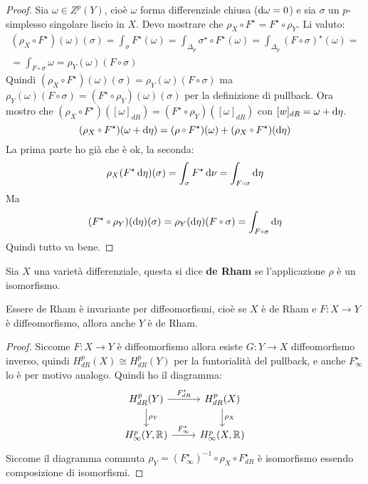 \begin{proof}
  Sia $ \omega \in Z^p(Y) $, cioè $ \omega $ forma differenziale chiusa ($ \operatorname{d}\!{\omega} = 0 $)
  e sia $ \sigma $ un $ p $-simplesso singolare liscio in $ X $. Devo
  mostrare che $ \rho_X \circ F^\star = F^\star \circ \rho_Y $. Li valuto:
  \begin{gather*}
    (\rho_X \circ F^\star)(\omega)(\sigma) = \int_\sigma F^\star(\omega) = \int_{\Delta_p} \sigma^\star \circ F^\star (\omega) = \int_{\Delta_p} (F \circ \sigma)^\star(\omega) = \\
    = \int_{F \circ \sigma} \omega = \rho_Y(\omega)(F \circ \sigma)
  \end{gather*}
  Quindi $ (\rho_X \circ F^\star)(\omega)(\sigma) = \rho_Y(\omega)(F \circ \sigma) $ ma $ \rho_Y(\omega)(F \circ \sigma) = (F^\star \circ \rho_Y)(\omega)(\sigma) $
  per la definizione di pullback.
  Ora mostro che $ (\rho_X \circ F^\star)([\omega]_{dR}) = (F^\star \circ \rho_Y)([\omega]_{dR}) $ con $ [w]_{dR} = \omega + \operatorname{d}\!{\eta} $.
  \[
    (\rho_X \circ F^\star)(\omega + \d \eta) = (\rho \circ F^\star)(\omega) + (\rho_X \circ F^\star)(\d \eta)
  \]
  La prima parte ho già che è ok, la seconda:
  \[
    \rho_X(F^\star \d \eta)(\sigma) = \int_\sigma F^\star \d \nu = \int_{F \circ \sigma} \d \eta
  \]
  Ma
  \[
    (F^\star \circ \rho_Y)(\d \eta)(\sigma) = \rho_Y(\d \eta)(F \circ \sigma) = \int_{F \circ \sigma} \d \eta
  \]
  Quindi tutto va bene.
\end{proof}
\begin{definition}
  Sia $ X $ una varietà differenziale, questa si dice \textbf{de Rham}
  se l'applicazione $ \rho $ è un isomorfismo.
\end{definition}
\begin{lemma}
  Essere de Rham è invariante per diffeomorfismi, cioè se $ X $ è de Rham e $ F \colon X \to Y $
  è diffeomorfismo, allora anche $ Y $ è de Rham.
\end{lemma}
\begin{proof}
  Siccome $ F \colon X \to Y $ è diffeomorfismo allora esiste $ G \colon Y \to X $ diffeomorfismo
  inverso, quindi $ H^p_{dR}(X) \cong H^p_{dR}(Y) $ per la funtorialità del pullback,
  e anche $ F^\star_\infty $ lo è per motivo analogo.
  Quindi ho il diagramma:
  \[
    \begin{tikzcd}
      H^p_{dR}(Y) \dar{\rho_Y} \rar{F^\star_{dR}} & H^p_{dR}(X) \dar{\rho_X} \\
      H^p_\infty(Y, \RN{}) \rar{F^\star_\infty} & H^p_\infty(X, \RN{})
    \end{tikzcd}
  \]
  Siccome il diagramma commuta $ \rho_Y = (F^\star_\infty)^{-1} \circ \rho_X \circ F^\star_{dR} $ è
  isomorfismo essendo composizione di isomorfismi.
\end{proof}

